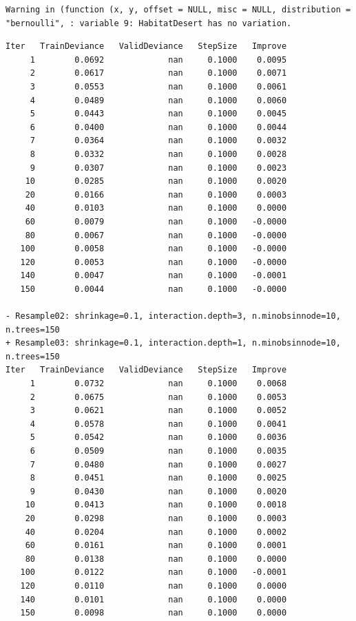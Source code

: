 \documentclass[
  letterpaper,
  DIV=11,
  numbers=noendperiod]{scrartcl}
\begin{document}
\begin{verbatim}
Warning in (function (x, y, offset = NULL, misc = NULL, distribution =
"bernoulli", : variable 9: HabitatDesert has no variation.
\end{verbatim}

\begin{verbatim}
Iter   TrainDeviance   ValidDeviance   StepSize   Improve
     1        0.0692             nan     0.1000    0.0095
     2        0.0617             nan     0.1000    0.0071
     3        0.0553             nan     0.1000    0.0061
     4        0.0489             nan     0.1000    0.0060
     5        0.0443             nan     0.1000    0.0045
     6        0.0400             nan     0.1000    0.0044
     7        0.0364             nan     0.1000    0.0032
     8        0.0332             nan     0.1000    0.0028
     9        0.0307             nan     0.1000    0.0023
    10        0.0285             nan     0.1000    0.0020
    20        0.0166             nan     0.1000    0.0003
    40        0.0103             nan     0.1000    0.0000
    60        0.0079             nan     0.1000   -0.0000
    80        0.0067             nan     0.1000   -0.0000
   100        0.0058             nan     0.1000   -0.0000
   120        0.0053             nan     0.1000   -0.0000
   140        0.0047             nan     0.1000   -0.0001
   150        0.0044             nan     0.1000   -0.0000

- Resample02: shrinkage=0.1, interaction.depth=3, n.minobsinnode=10, n.trees=150 
+ Resample03: shrinkage=0.1, interaction.depth=1, n.minobsinnode=10, n.trees=150 
Iter   TrainDeviance   ValidDeviance   StepSize   Improve
     1        0.0732             nan     0.1000    0.0068
     2        0.0675             nan     0.1000    0.0053
     3        0.0621             nan     0.1000    0.0052
     4        0.0578             nan     0.1000    0.0041
     5        0.0542             nan     0.1000    0.0036
     6        0.0509             nan     0.1000    0.0035
     7        0.0480             nan     0.1000    0.0027
     8        0.0451             nan     0.1000    0.0025
     9        0.0430             nan     0.1000    0.0020
    10        0.0413             nan     0.1000    0.0018
    20        0.0298             nan     0.1000    0.0003
    40        0.0204             nan     0.1000    0.0002
    60        0.0161             nan     0.1000    0.0001
    80        0.0138             nan     0.1000    0.0000
   100        0.0122             nan     0.1000   -0.0001
   120        0.0110             nan     0.1000    0.0000
   140        0.0101             nan     0.1000    0.0000
   150        0.0098             nan     0.1000    0.0000


\end{verbatim}
\end{document}
